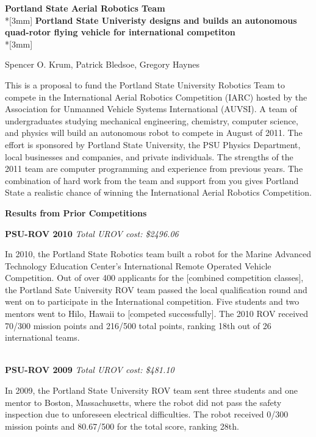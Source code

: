 \documentclass{article}
\begin{document}
\begin{center}
{\Large{\bf Portland State Aerial Robotics Team}}\\*[3mm]
{\bf Portland State Univeristy designs and builds an autonomous quad-rotor flying vehicle for international competiton} \\*[3mm]

Spencer O. Krum, Patrick Bledsoe, Gregory Haynes

\end{center}


This is a  proposal to fund the Portland State University Robotics Team to compete in the  International Aerial Robotics Competition (IARC) hosted by the Association for Unmanned Vehicle Systems International (AUVSI). A team of undergraduates studying mechanical engineering,
 chemistry, computer science, and physics will build an autonomous robot to compete in August of 2011. The effort is sponsored by Portland State University, 
the PSU Physics Department, local businesses and companies, and private individuals.  The strengths of the 2011 team are computer programming and experience from previous years. The combination of hard work 
from the team and support from you gives Portland State a realistic chance of winning the International Aerial Robotics Competition.  


\centerline{\bf Results from Prior Competitions}

\noindent
{\bf PSU-ROV 2010}
{\it Total UROV cost: \$2496.06}

In 2010, the Portland State Robotics team built a robot for the Marine Advanced Technology Education Center's International Remote Operated Vehicle Competition. Out of over 400 applicants for the [combined competition classes], the Portland Sate University ROV team passed the local qualification round and went on to participate in the International competition. 
Five students and two mentors went to Hilo, Hawaii to [competed successfully]. The 2010 ROV received 70/300 mission points and 216/500 total points, 
ranking 18th out of 26 international teams.

\ \\
\noindent
{\bf PSU-ROV 2009}
{\it Total UROV cost: \$481.10}

In 2009, the Portland State University ROV team sent three students and one mentor to Boston, Massachusetts, where the robot did not pass the safety inspection 
due to unforeseen electrical difficulties.  The robot received 0/300 mission points and 80.67/500 for the total score, ranking 28th. 
\end{document}
